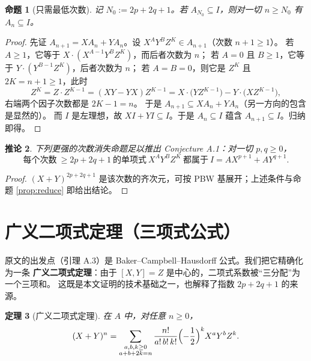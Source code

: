 \documentclass[11pt,UTF8]{ctexart}
\newtheorem{theorem}{定理}[section]
\newtheorem{proposition}[theorem]{命题}
\newtheorem{corollary}[theorem]{推论}
\theoremstyle{definition}
\begin{document}
\begin{proposition}[只需最低次数]\label{prop:degree}
记 $N_0:=2p+2q+1$。若 $A_{N_0}\subseteq I$，则对一切 $n\ge N_0$ 有 $A_n\subseteq I$。
\end{proposition}

\begin{proof}
先证 $A_{n+1}=X A_n+Y A_n$。设 $X^{A}Y^{B}Z^{K}\in A_{n+1}$（次数 $n+1\ge1$）。
若 $A\ge1$，它等于 $X\cdot(X^{A-1}Y^BZ^K)$，而后者次数为 $n$；
若 $A=0$ 且 $B\ge1$，它等于 $Y\cdot(Y^{B-1}Z^K)$，后者次数为 $n$；
若 $A=B=0$，则它是 $Z^{K}$ 且 $2K=n+1\ge1$，此时
\[
Z^{K}=Z\cdot Z^{K-1}=(XY-YX)Z^{K-1}=X\cdot\bigl(YZ^{K-1}\bigr)-Y\cdot\bigl(XZ^{K-1}\bigr),
\]
右端两个因子次数都是 $2K-1=n$。
于是 $A_{n+1}\subseteq XA_n+YA_n$（另一方向的包含是显然的）。
而 $I$ 是左理想，故 $XI+YI\subseteq I$。于是 $A_n\subseteq I$ 蕴含 $A_{n+1}\subseteq I$。归纳即得。
\end{proof}

\begin{corollary}\label{cor:reduce}
下列更强的次数消失命题足以推出 Conjecture A.1：对一切 $p,q\ge0$，
\[
\text{每个次数}\ \ge 2p+2q+1\ \text{的单项式}\ X^{A}Y^{B}Z^{K}\ \text{都属于}\ I=AX^{p+1}+AY^{q+1}.
\]
\end{corollary}
\begin{proof}
$(X+Y)^{2p+2q+1}$ 是该次数的齐次元，可按 PBW 基展开；上述条件与命题 \ref{prop:reduce} 即给出结论。
\end{proof}

\section{广义二项式定理（三项式公式）}\label{sec:binom}

原文的出发点（引理 A.3）是 Baker--Campbell--Hausdorff 公式。我们把它精确化为一条
\textbf{广义二项式定理}：由于 $[X,Y]=Z$ 是中心的，二项式系数被“三分配”为一个三项和。
这既是本文证明的技术基础之一，也解释了指数 $2p+2q+1$ 的来源。

\begin{theorem}[广义二项式定理]\label{thm:trinomial}
在 $A$ 中，对任意 $n\ge0$，
\begin{equation}\label{eq:tri}
(X+Y)^{n}=\sum_{\substack{a,b,k\ge0\\ a+b+2k=n}}\frac{n!}{a!\,b!\,k!}\Bigl(-\frac12\Bigr)^{k}X^{a}Y^{b}Z^{k}.
\end{equation}
\end{theorem}
\end{document}
